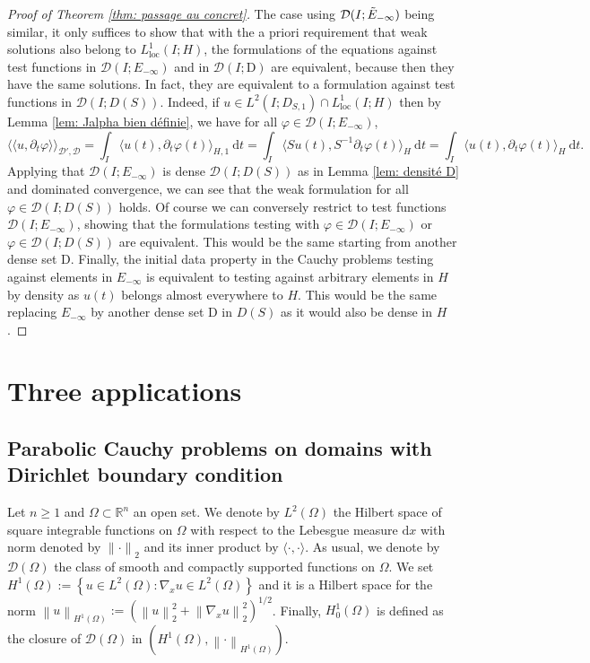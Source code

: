 \documentclass[11pt, letterpaper]{amsart}
\theoremstyle{definition}
\theoremstyle{remark}
\newcommand{\llangle}{\langle\!\langle}
\newcommand{\rrangle}{\rangle\!\rangle}
\numberwithin{equation}{section}
\begin{document}
\begin{proof}[Proof of Theorem \ref{thm: passage au concret}]  The case using $\mathcal{D}(I;\Tilde{E}_{-\infty})$ being similar, it only suffices to show that with the a priori requirement that  weak solutions also belong to $L^1_{\mathrm{loc}}(I;H)$, the formulations of the equations against test functions in $ \mathcal{D}(I ; E_{-\infty})$  and in $\mathcal{D}(I;\mathrm{D})$ are equivalent, because then they have the same solutions. In fact, they are equivalent to a formulation against test functions in $\mathcal{D}(I ; D(S))$. Indeed, if  $u \in L^2(I;D_{S,1})\cap L^1_{\mathrm{loc}}(I;H)$ then by Lemma \ref{lem: Jalpha bien définie}, we have for all $ \varphi \in \mathcal{D}(I ; E_{-\infty})$,
$$\llangle u , \partial_t \varphi \rrangle_{\mathcal{D}',\mathcal{D}} =\int_{I} \langle u (t), \partial_t \varphi(t) \rangle_{H,1} \ \mathrm{d}t= \int_{I} \langle S u(t) , S^{-1} \partial_t \varphi(t) \rangle_H \ \mathrm{d}t = \int_{I} \langle u (t), \partial_t \varphi(t) \rangle_H \ \mathrm{d}t.$$
Applying that   $ \mathcal{D}(I ; E_{-\infty})$ is dense $\mathcal{D}(I ; D(S))$ as in  Lemma \ref{lem: densité D} and dominated convergence, we can see that the weak formulation for all $\varphi \in \mathcal{D}(I ; D(S))$ holds. Of course we can conversely restrict to test functions $ \mathcal{D}(I ; E_{-\infty})$, showing that the formulations testing  with $\varphi \in \mathcal{D}(I ; E_{-\infty})$ or  $\varphi \in \mathcal{D}(I ; D(S))$ are equivalent. This would be the same starting from another dense set $\mathrm{D}$. Finally, the initial data property in the Cauchy problems testing against elements in $E_{-\infty}$ is equivalent to testing against arbitrary elements in $H$ by density as $u(t)$ belongs almost everywhere to $H$. This would be the same replacing $E_{-\infty}$ by another dense set $\mathrm{D}$ in $D(S)$ as it would also be dense in $H$.
 \end{proof}
\section{Three applications }\label{Section 6}
\subsection{Parabolic Cauchy problems on domains with Dirichlet boundary condition}
Let $n\ge 1$ and $\Omega \subset \mathbb{R}^n$ an open set. We denote by $L^2(\Omega)$ the Hilbert space of square integrable functions on $\Omega$ with respect to the Lebesgue measure $\mathrm{d}x$ with norm  denoted by ${\lVert \cdot  \rVert}_{2}$ and its inner product by $\langle \cdot ,\cdot \rangle$. As usual, we denote by $\mathcal{D}(\Omega)$ the class of smooth and compactly supported functions on $\Omega$. We set $H^1(\Omega):=\left\{ u \in L^2(\Omega)  :  \nabla_x u \in L^2(\Omega) \right\}$ and it is a Hilbert space for the norm $\left\| u \right\|_{H^1(\Omega)}:=( \left\| u \right\|_{2}^2+\left\| \nabla_x u \right\|_{2}^2 )^{1/2}$. Finally, $H^1_0(\Omega)$ is defined as the closure of $\mathcal{D}(\Omega)$ in $(H^1(\Omega),\left\| \cdot \right\|_{H^1(\Omega)})$. 
\end{document}
